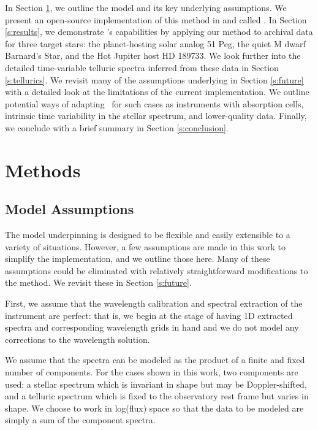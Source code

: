 \documentclass[modern]{aastex62}
\newcommand{\Mdwarf}{Barnard's Star\xspace} %
\begin{document}
In Section \ref{s:methods}, we outline the model and its key underlying assumptions.
We present an open-source implementation of this method in \python and \TF
\citep{Abadi15} called \wobble.
In Section \ref{s:results}, we demonstrate \wobble's capabilities by applying our method to \HARPS archival data for three target stars: the planet-hosting solar analog 51 Peg, the quiet M dwarf \Mdwarf, and the Hot Jupiter host HD 189733.
We look further into the detailed time-variable telluric spectra inferred from these data in Section \ref{s:tellurics}.
We revisit many of the assumptions underlying \wobble in Section \ref{s:future} with a detailed look at the limitations of the current implementation.
We outline potential ways of adapting \wobble\ for such cases as instruments with absorption cells, intrinsic time variability in the stellar spectrum, and lower-quality data.
Finally, we conclude with a brief summary in Section \ref{s:conclusion}.

\section{Methods}
\label{s:methods}
\subsection{Model Assumptions}
\label{s:assumptions}

The model underpinning \wobble is designed to be flexible and easily extensible to a variety of situations.
However, a few assumptions are made in this work to simplify the implementation, and we outline those here.
Many of these assumptions could be eliminated with relatively straightforward modifications to the method.
We revisit these in Section \ref{s:future}.

First, we assume that the wavelength calibration and spectral extraction of the instrument are perfect: that is, we begin at the stage of having 1D extracted spectra and corresponding wavelength grids in hand and we do not model any corrections to the wavelength solution.

We assume that the spectra can be modeled as the product of a finite and fixed number of components.
For the cases shown in this work, two components are used: a stellar spectrum which is invariant in shape but may be Doppler-shifted, and a telluric spectrum which is fixed to the observatory rest frame but varies in shape.
We choose to work in log(flux) space so that the data to be modeled are simply a sum of the component spectra.
\end{document}
